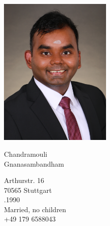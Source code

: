 \documentclass{mycv}
\begin{document}
\sloppy %
\color{templateColor1}
\AddToShipoutPicture{\BackgroundPic}

\normalfont
\begin{minipage}[c]{0.32\textwidth}
  \includegraphics[width=5.45cm]{../img/CV_Photo_new_comp.png}
\end{minipage}
\begin{minipage}[]{0.8\textwidth}

  \vspace{5mm}
      {\Huge Chandramouli}\\

	{\Huge Gnanasambandham}
	\vspace{2mm}

	\vspace{2mm}

  Arthurstr. 16\\
	70565 Stuttgart\\

  .1990\\
  \maritalStatusIcon Married, no children\\
  \telephoneIcon +49 179 6588043\\
  \mailIcon \href{mailto:chandramouli@torc.ai}{}
  
  \vspace{13mm}
\end{minipage}
\end{document}
